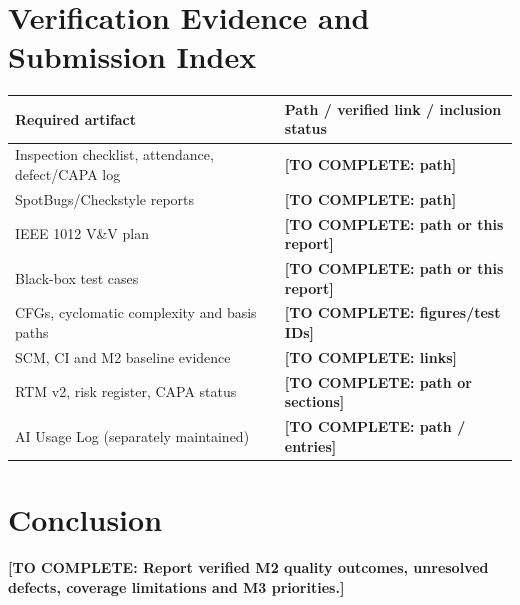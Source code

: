 \documentclass[11pt,a4paper]{article}
\newcommand{\todo}[1]{\textcolor{red!70!black}{\textbf{[TO COMPLETE: #1]}}}
\begin{document}
\section{Verification Evidence and Submission Index}
\begin{longtable}{L{5.1cm} L{7.6cm}}\toprule
\textbf{Required artifact} & \textbf{Path / verified link / inclusion status}\\\midrule\endhead
Inspection checklist, attendance, defect/CAPA log & \todo{path}\\
SpotBugs/Checkstyle reports & \todo{path}\\
IEEE 1012 V\&V plan & \todo{path or this report}\\
Black-box test cases & \todo{path or this report}\\
CFGs, cyclomatic complexity and basis paths & \todo{figures/test IDs}\\
SCM, CI and M2 baseline evidence & \todo{links}\\
RTM v2, risk register, CAPA status & \todo{path or sections}\\
AI Usage Log (separately maintained) & \todo{path / entries}\\\bottomrule\end{longtable}
\section*{Conclusion}
\todo{Report verified M2 quality outcomes, unresolved defects, coverage limitations and M3 priorities.}
\end{document}
